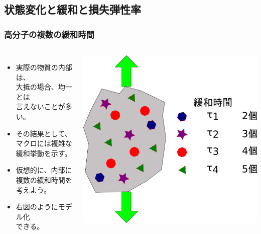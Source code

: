 \documentclass[unicode,12pt]{beamer}%
\begin{document}
\subsection{状態変化と緩和と損失弾性率}
\begin{frame}
	\frametitle{高分子の複数の緩和時間}
		\begin{columns}[c, onlytextwidth]
			\begin{itemize}
				\item 実際の物質の内部は、\\大抵の場合、均一とは\\言えないことが多い。
				\item その結果として、マクロには複雑な緩和挙動を示す。
				\item \alert{仮想的}に、内部に\alert{複数の緩和時間}を考えよう。
				\item 右図のように\alert{モデル化}\\できる。
			\end{itemize}
				\includegraphics[width=\textwidth]{relux_multi.png}
		\end{columns}
\end{frame}
\end{document}
